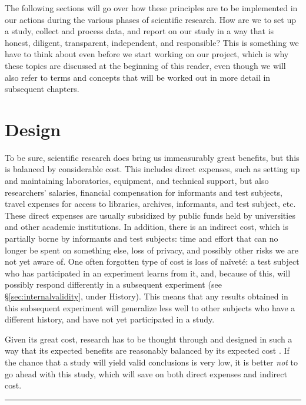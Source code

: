 \documentclass[
]{book}
\begin{document}
The following sections will go over how these principles are to be implemented in our actions during the various phases of scientific research. How are we to set up a study, collect and process data, and report on our study in a way that is honest, diligent, transparent, independent, and responsible? This is something we have to think about even before we start working on our project, which is why these topics are discussed at the beginning of this reader, even though we will also refer to terms and concepts that will be worked out in more detail in subsequent chapters.

\hypertarget{sec:design}{%
\section{Design}\label{sec:design}}

To be sure, scientific research does bring us immeasurably great benefits, but this is balanced by considerable cost. This includes direct expenses, such as setting up and maintaining laboratories, equipment, and technical support, but also researchers' salaries, financial compensation for informants and test subjects, travel expenses for access to libraries, archives, informants, and test subject, etc. These direct expenses are usually subsidized by public funds held by universities and other academic institutions. In addition, there is an indirect cost, which is partially borne by informants and test subjects: time and effort that can no longer be spent on something else, loss of privacy, and possibly other risks we are not yet aware of. One often forgotten type of cost is loss of naïveté: a test subject who has participated in an experiment learns from it, and, because of this, will possibly respond differently in a subsequent experiment (see §\ref{sec:internalvalidity}, under History). This means that any results obtained in this subsequent experiment will generalize less well to other subjects who have a different history, and have not yet participated in a study.

Given its great cost, research has to be thought through and designed in such a way that its expected benefits are reasonably balanced by its expected cost \citep[Ch.3]{Rose08}. If the chance that a study will yield valid conclusions is very low, it is better \emph{not} to go ahead with this study, which will save on both direct expenses and indirect cost.

\begin{center}\rule{0.5\linewidth}{0.5pt}\end{center}
\end{document}
